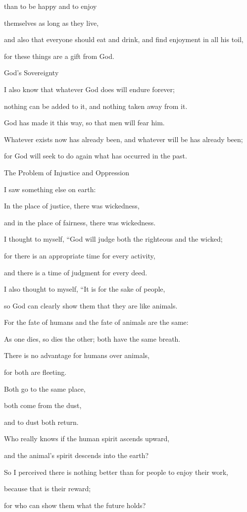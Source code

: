{\par }{\Q than
to be happy
and to enjoy
\par }{\Q themselves
as long as they live,
\par }{\Q {}and also
that everyone
should eat
and drink,
and find
enjoyment
in all
his toil,
\par }{\Q for these things are a gift
from God.
\par }{\SH God’s Sovereignty
\par }{\Q {}I also know
that
whatever
God
does
will endure forever;
\par }{\Q nothing
can be added
to it,
and nothing
taken
away from it.
\par }{\Q God
has made
it this way, so that men will fear him.
\par }{\Q {}Whatever
exists now has already
been, and whatever
will be
has already
been;
\par }{\Q for God
will seek
to do again what has occurred in the past.
\par }{\SH The Problem of Injustice and Oppression
\par }{\Q {}I saw
something else on earth:

\par }{\Q In the place
of justice,
there
was wickedness,
\par }{\Q and in the place
of fairness,
there
was wickedness.
\par }{\Q {}I thought
to myself,
“God
will judge
both the righteous
and the
wicked;
\par }{\Q for
there is an appropriate time
for every
activity,
\par }{\Q and there
is a time of judgment for every
deed.
\par }{\Q {}I
also thought
to myself,
“It is for the sake
of people,
\par }{\Q so God
can clearly
show
them that they
are like animals.
\par }{\Q {}For
the fate
of humans
and the fate
of animals
are the same:
\par }{\Q As one
dies,
so
dies
the other; both have the same
breath.
\par }{\Q There is no
advantage
for humans
over animals,
\par }{\Q for
both
are fleeting.
\par }{\Q {}Both
go
to
the same
place,
\par }{\Q both
come from
the dust,
\par }{\Q and to dust
both
return.
\par }{\Q {}Who
really knows
if the human
spirit
ascends
upward,
\par }{\Q and the animal’s
spirit
descends
into the earth?
\par }{\Q {}So I perceived
there is nothing
better
than for people
to enjoy
their work,
\par }{\Q because
that
is their reward;
\par }{\Q for
who
can show
them what
the future holds?

}
